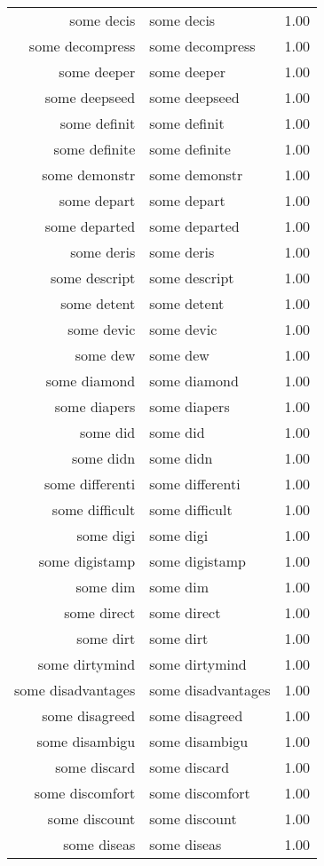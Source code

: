 \begin{table}[ht]
\begin{tabular}{rlr}
  some decis & some decis & 1.00 \\ 
  some decompress & some decompress & 1.00 \\ 
  some deeper & some deeper & 1.00 \\ 
  some deepseed & some deepseed & 1.00 \\ 
  some definit & some definit & 1.00 \\ 
  some definite & some definite & 1.00 \\ 
  some demonstr & some demonstr & 1.00 \\ 
  some depart & some depart & 1.00 \\ 
  some departed & some departed & 1.00 \\ 
  some deris & some deris & 1.00 \\ 
  some descript & some descript & 1.00 \\ 
  some detent & some detent & 1.00 \\ 
  some devic & some devic & 1.00 \\ 
  some dew & some dew & 1.00 \\ 
  some diamond & some diamond & 1.00 \\ 
  some diapers & some diapers & 1.00 \\ 
  some did & some did & 1.00 \\ 
  some didn & some didn & 1.00 \\ 
  some differenti & some differenti & 1.00 \\ 
  some difficult & some difficult & 1.00 \\ 
  some digi & some digi & 1.00 \\ 
  some digistamp & some digistamp & 1.00 \\ 
  some dim & some dim & 1.00 \\ 
  some direct & some direct & 1.00 \\ 
  some dirt & some dirt & 1.00 \\ 
  some dirtymind & some dirtymind & 1.00 \\ 
  some disadvantages & some disadvantages & 1.00 \\ 
  some disagreed & some disagreed & 1.00 \\ 
  some disambigu & some disambigu & 1.00 \\ 
  some discard & some discard & 1.00 \\ 
  some discomfort & some discomfort & 1.00 \\ 
  some discount & some discount & 1.00 \\ 
  some diseas & some diseas & 1.00 \\ 

\end{tabular}
\end{table}
